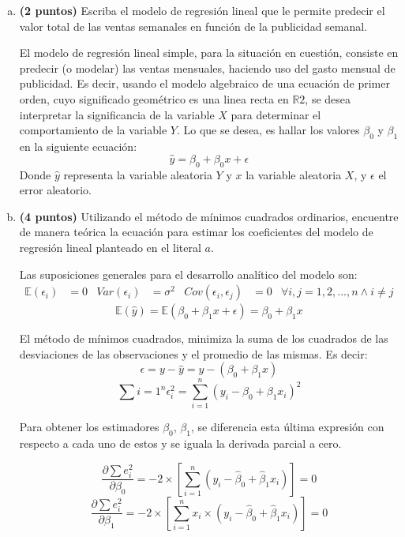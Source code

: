 \documentclass[../main.tex]{subfiles}
\begin{document}
\begin{enumerate}[(a)]

\item \textbf{(2 puntos)}  Escriba el modelo de regresión lineal que le permite predecir el valor total de las ventas semanales en función de la publicidad semanal.

El modelo de regresión lineal simple, para la situación en cuestión, consiste en predecir (o modelar) las ventas mensuales, haciendo uso del gasto mensual de publicidad. Es decir, usando el modelo algebraico de una ecuación de primer orden, cuyo significado geométrico es una linea recta en $\mathbb{R}2$, se desea interpretar la significancia de la variable $X$ para determinar el comportamiento de la variable $Y$. Lo que se desea, es hallar los valores $\beta_0$ y $\beta_1$ en la siguiente ecuación:
$$\hat{y} = \beta_0 + \beta_0 x + \epsilon$$
Donde $\hat{y}$ representa la variable aleatoria $Y$ y $x$ la variable aleatoria $X$, y $\epsilon$ el error aleatorio.

\item \textbf{(4 puntos)}  Utilizando el método de mínimos cuadrados ordinarios, encuentre de manera teórica la ecuación para estimar los coeficientes del modelo de regresión lineal planteado en el literal $a$.

Las suposiciones generales para el desarrollo analítico del modelo son:
\begin{align*}
	\mathbb{E}(\epsilon_i) &= 0 & Var(\epsilon_i) &= \sigma ^2 & Cov(\epsilon_i, \epsilon_j) &= 0 & \forall i, j = 1, 2, ..., n \wedge i \neq j
\end{align*}
$$
\mathbb{E}(\hat{y}) = \mathbb{E}(\beta_0 + \beta_1 x + \epsilon) = \beta_0 + \beta_1 x 
$$

El método de mínimos cuadrados, minimiza la suma de los cuadrados de las desviaciones de las observaciones y el promedio de las mismas. Es decir:
$$\epsilon = y - \hat{y} = y - (\beta_0 + \beta_1 x)$$
$$\sum{i = 1}^{n} \epsilon_i ^2 = \sum_{i = 1}^{n}\left( y_i - \beta_0 + \beta_1 x_i\right) ^2$$

Para obtener los estimadores $\beta_0$, $\beta_1$, se diferencia esta última expresión con respecto a cada uno de estos y se iguala la derivada parcial a cero.

$$\frac{\partial \sum e_i^2}{\partial \beta_0} = -2 \times \left[\sum_{i = 1}^{n}\left( y_i - \hat{\beta}_0 + \hat{\beta}_1 x_i\right)\right] = 0$$
$$\frac{\partial \sum e_i^2}{\partial \beta_1} = -2 \times \left[\sum_{i = 1}^{n}x_i \times\left( y_i - \hat{\beta}_0 + \hat{\beta}_1 x_i\right)\right] = 0$$


\end{enumerate}
\end{document}
